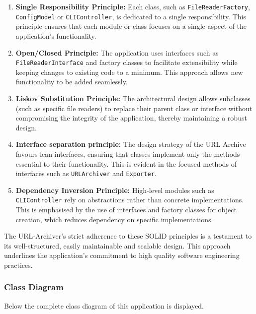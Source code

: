 \begin{enumerate}
	\item \textbf{Single Responsibility Principle:} Each class, such as \texttt{FileReaderFactory}, \texttt{ConfigModel} or \texttt{CLIController}, is dedicated to a single responsibility. This principle ensures that each module or class focuses on a single aspect of the application's functionality.
	\item \textbf{Open/Closed Principle:} The application uses interfaces such as \texttt{FileReaderInterface} and factory classes to facilitate extensibility while keeping changes to existing code to a minimum. This approach allows new functionality to be added seamlessly.
	\item \textbf{Liskov Substitution Principle:} The architectural design allows subclasses (such as specific file readers) to replace their parent class or interface without compromising the integrity of the application, thereby maintaining a robust design.
	\item \textbf{Interface separation principle:} The design strategy of the URL Archive favours lean interfaces, ensuring that classes implement only the methods essential to their functionality. This is evident in the focused methods of interfaces such as \texttt{URLArchiver} and \texttt{Exporter}.
	\item \textbf{Dependency Inversion Principle:} High-level modules such as \texttt{CLIController} rely on abstractions rather than concrete implementations. This is emphasised by the use of interfaces and factory classes for object creation, which reduces dependency on specific implementations.
\end{enumerate}

The URL-Archiver's strict adherence to these SOLID principles is a testament to its well-structured, easily maintainable and scalable design. This approach underlines the application's commitment to high quality software engineering practices.

\subsubsection{Class Diagram}
Below the complete class diagram of this application is displayed. 

\clearpage




